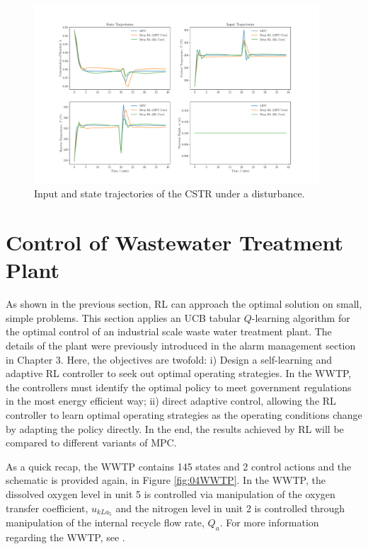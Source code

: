 \begin{figure}[H]
    \centering
    \includegraphics[width=0.95\textwidth]{images/ch4/States_and_Inputs_CSTR.pdf}
    \caption{Input and state trajectories of the CSTR under a disturbance.}
    \label{fig:04CSTR_Dis}
\end{figure}









\section{Control of Wastewater Treatment Plant}
As shown in the previous section, RL can approach the optimal solution on small, simple problems.  This section applies an UCB tabular $Q$-learning algorithm for the optimal control of an industrial scale waste water treatment plant.  The details of the plant were previously introduced in the alarm management section in Chapter 3.  Here, the objectives are twofold: i) Design a self-learning and adaptive RL controller to seek out optimal operating strategies. In the WWTP, the controllers must identify the optimal policy to meet government regulations in the most energy efficient way; ii) direct adaptive control, allowing the RL controller to learn optimal operating strategies as the operating conditions change by adapting the policy directly. In the end, the results achieved by RL will be compared to different variants of MPC.

As a quick recap, the WWTP contains 145 states and 2 control actions and the schematic is provided again, in Figure \ref{fig:04WWTP}. In the WWTP, the dissolved oxygen level in unit 5 is controlled via manipulation of the oxygen transfer coefficient, $u_{kLa_5}$ and the nitrogen level in unit 2 is controlled through manipulation of the internal recycle flow rate, $Q_a$.  For more information regarding the WWTP, see \cite{wwtp}.

